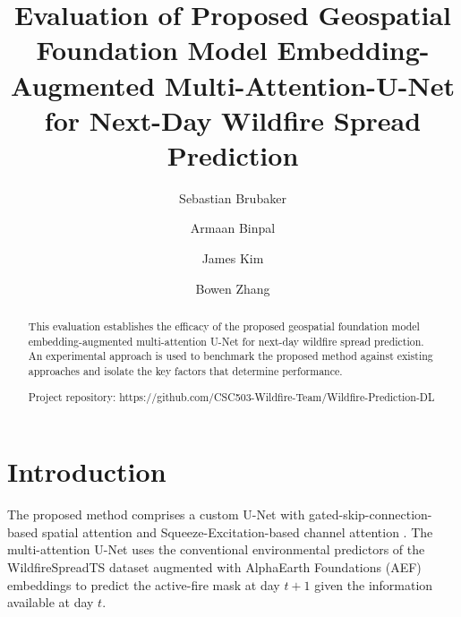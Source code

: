 \documentclass[sigconf]{acmart}
\begin{document}
\title{Evaluation of Proposed Geospatial Foundation Model Embedding-Augmented Multi-Attention-U-Net 
for Next-Day Wildfire Spread Prediction}

\author{Sebastian Brubaker}

\author{Armaan Binpal}

\author{James Kim}

\author{Bowen Zhang}


\begin{abstract}
This evaluation establishes the efficacy of the proposed geospatial foundation model 
embedding-augmented multi-attention U-Net for next-day wildfire spread prediction. An experimental
approach is used to benchmark the proposed method against existing approaches and isolate the key factors 
that determine performance.

Project repository: https://github.com/CSC503-Wildfire-Team/Wildfire-Prediction-DL
\end{abstract}

\maketitle

\section{Introduction}
The proposed method comprises a custom U-Net with gated-skip-connection-based spatial attention \cite{almakrami} and 
Squeeze-Excitation-based channel attention \cite{SE2017}. The multi-attention U-Net uses the conventional environmental 
predictors of the WildfireSpreadTS dataset \cite{gerard2023wildfirespreadts} augmented with AlphaEarth Foundations (AEF) 
embeddings \cite{brown} to predict the active-fire mask at day $t+1$ given the information available at day $t$.
\end{document}
